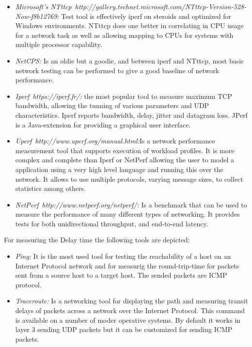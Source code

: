 \begin{itemize}
\item \emph{Microsoft's NTttcp~{http://gallery.technet.microsoft.com/NTttcp-Version-528-Now-f8b12769}:} Test tool is effectively iperf on steroids and
  optimized for Windows environments. NTttcp does one better in correlating in
  CPU usage for a network task as well as allowing mapping to CPUs for systems
  with multiple processor capability. 
\item \emph{NetCPS:} Is an oldie but a goodie, and between iperf and NTttcp,
  most basic network testing can be performed to give a good baseline of network
  performance.
\item \emph{Iperf~{https://iperf.fr/}:} the most popular tool to measure maximum TCP bandwidth, allowing the
  tunning of various parameters and UDP characteristics. Iperf reports
  bandwidth, delay, jitter and datagram loss. JPerf is a Java-extension for
  providing a graphical user interface.
\item \emph{Uperf~{http://www.uperf.org/manual.html}:}Is a network
  performance measurement tool that supports execution of workload profiles. It
  is more complex and complete than Iperf or NetPerf allowing the user to model
  a application using a very high level language and running this over the
  network. It allows to use multiple protocols, varying message sizes, to
  collect statistics among others.
\item \emph{NetPerf~{http://www.netperf.org/netperf/}:} Is a benchmark that can be used to measure the performance of many different types of networking. It provides tests for both unidirectional throughput, and end-to-end latency.
\end{itemize}

For measuring the Delay time the following tools are depicted:
\begin{itemize}
\item \emph{Ping:} It is the most used tool for testing the reachability of a host on an
  Internet Protocol network and for measurig the round-trip-time for packets sent
  from a source host to a target host. The sended packets are \ac{ICMP} protocol.
\item \emph{Traceroute:} Is a networking tool for displaying the path and
  measuring transit delays of packets across a network over the Internet
  Protocol. This command is available on a number of moder operative systems. By
  default it works in layer 3 sending \ac{UDP} packets but it can be customized
  for sending \ac{ICMP} packets.
\end{itemize}


